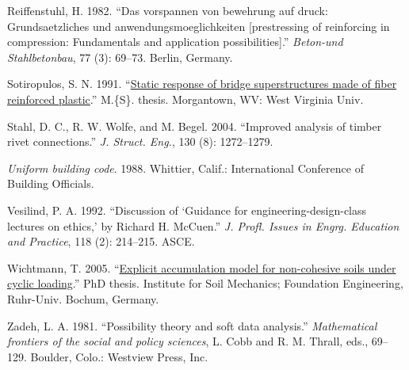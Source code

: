 \documentclass[NewProceedings, InsideFigs,LineNumbers]{asce-quarto}
\newlength{\cslhangindent}
\newenvironment{CSLReferences}[2] %
 {\begin{list}{}{%
  \setlength{\itemindent}{0pt}
  \setlength{\leftmargin}{0pt}
  \setlength{\parsep}{0pt}
  \ifodd #1
   \setlength{\leftmargin}{\cslhangindent}
   \setlength{\itemindent}{-1\cslhangindent}
  \fi
  \setlength{\itemsep}{#2\baselineskip}}}
 {\end{list}}
\begin{document}
\begin{CSLReferences}{1}{0}
Reiffenstuhl, H. 1982. {``Das vorspannen von bewehrung auf druck:
Grundsaetzliches und anwendungsmoeglichkeiten {[}prestressing of
reinforcing in compression: Fundamentals and application
possibilities{]}.''} \emph{Beton-und Stahlbetonbau}, 77 (3): 69--73.
Berlin, Germany.

Sotiropulos, S. N. 1991. {``\href{}{Static response of bridge
superstructures made of fiber reinforced plastic}.''} M.\{S\}. thesis.
Morgantown, WV: West Virginia Univ.

Stahl, D. C., R. W. Wolfe, and M. Begel. 2004. {``Improved analysis of
timber rivet connections.''} \emph{J. Struct. Eng.}, 130 (8):
1272--1279.

\emph{Uniform building code}. 1988. Whittier, Calif.: International
Conference of Building Officials.

Vesilind, P. A. 1992. {``Discussion of {`{G}uidance for
engineering-design-class lectures on ethics,'} by {R}ichard {H}.
{M}c{C}uen.''} \emph{J. Profl. Issues in Engrg. Education and Practice},
118 (2): 214--215. ASCE.

Wichtmann, T. 2005.
{``\href{https://www.rz.uni-karlsruhe.de/$/sim$gn97/}{Explicit
accumulation model for non-cohesive soils under cyclic loading}.''} PhD
thesis. Institute for Soil Mechanics; Foundation Engineering, Ruhr-Univ.
Bochum, Germany.

Zadeh, L. A. 1981. {``Possibility theory and soft data analysis.''}
\emph{Mathematical frontiers of the social and policy sciences}, L. Cobb
and R. M. Thrall, eds., 69--129. Boulder, Colo.: Westview Press, Inc.

\end{CSLReferences}
\end{document}
